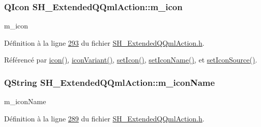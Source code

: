 \hypertarget{classSH__ExtendedQQmlAction_a4386f56e28c2c70cfedd16c1d8c2c4a4}{
\subsubsection[{m\-\_\-icon}]{\setlength{\rightskip}{0pt plus 5cm}Q\-Icon S\-H\-\_\-\-Extended\-Q\-Qml\-Action\-::m\-\_\-icon\hspace{0.3cm}{\ttfamily [private]}}}\label{classSH__ExtendedQQmlAction_a4386f56e28c2c70cfedd16c1d8c2c4a4}


m\-\_\-icon 



Définition à la ligne \hyperlink{SH__ExtendedQQmlAction_8h_source_l00293}{293} du fichier \hyperlink{SH__ExtendedQQmlAction_8h_source}{S\-H\-\_\-\-Extended\-Q\-Qml\-Action.\-h}.



Référencé par \hyperlink{classSH__ExtendedQQmlAction_a1ad6dd5cce1909ac371f70b5bc57d927}{icon()}, \hyperlink{classSH__ExtendedQQmlAction_a53e1244ef9cc77483684fdf57c236c76}{icon\-Variant()}, \hyperlink{classSH__ExtendedQQmlAction_aca3c862c9092a2cd7c2098f2132b0a45}{set\-Icon()}, \hyperlink{classSH__ExtendedQQmlAction_a348526d65cd47b4ea6378e2a62065135}{set\-Icon\-Name()}, et \hyperlink{classSH__ExtendedQQmlAction_ae34fe314ba335d65d99932b27f1404f7}{set\-Icon\-Source()}.

\hypertarget{classSH__ExtendedQQmlAction_a3375d1504e5ec862ed05500bf529d95c}{
\subsubsection[{m\-\_\-icon\-Name}]{\setlength{\rightskip}{0pt plus 5cm}Q\-String S\-H\-\_\-\-Extended\-Q\-Qml\-Action\-::m\-\_\-icon\-Name\hspace{0.3cm}{\ttfamily [private]}}}\label{classSH__ExtendedQQmlAction_a3375d1504e5ec862ed05500bf529d95c}


m\-\_\-icon\-Name 



Définition à la ligne \hyperlink{SH__ExtendedQQmlAction_8h_source_l00289}{289} du fichier \hyperlink{SH__ExtendedQQmlAction_8h_source}{S\-H\-\_\-\-Extended\-Q\-Qml\-Action.\-h}.



